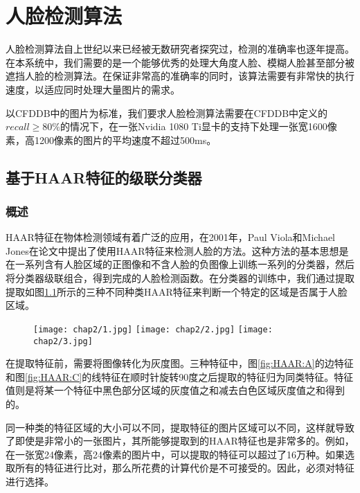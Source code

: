 \chapter{人脸检测算法}
\label{chap:facedetection}

人脸检测算法自上世纪以来已经被无数研究者探究过，检测的准确率也逐年提高。在本系统中，我们需要的是一个能够优秀的处理大角度人脸、模糊人脸甚至部分被遮挡人脸的检测算法。在保证非常高的准确率的同时，该算法需要有非常快的执行速度，以适应同时处理大量图片的需求。

以CFDDB中的图片为标准，我们要求人脸检测算法需要在CFDDB中定义的$recall\geq 80\%$的情况下，在一张Nvidia 1080 Ti显卡的支持下处理一张宽1600像素，高1200像素的图片的平均速度不超过500ms。


\section{基于HAAR特征的级联分类器}

\subsection{概述}
HAAR特征在物体检测领域有着广泛的应用，在2001年，Paul Viola和Michael Jones在论文中提出了使用HAAR特征来检测人脸的方法\cite{viola2004robust}。这种方法的基本思想是在一系列含有人脸区域的正图像和不含人脸的负图像上训练一系列的分类器，然后将分类器级联组合，得到完成的人脸检测函数。在分类器的训练中，我们通过提取提取如图\ref{fig:HAAR}所示的三种不同种类HAAR特征来判断一个特定的区域是否属于人脸区域。

\begin{figure}[!htp]
	\centering
	{\texttt{[image: chap2/1.jpg]}}
	\hspace{4em}
	{\texttt{[image: chap2/2.jpg]}}
	\hspace{4em}
	{\texttt{[image: chap2/3.jpg]}}
	\label{fig:HAAR}
\end{figure}

在提取特征前，需要将图像转化为灰度图。三种特征中，图\ref{fig:HAAR:A}的边特征和图\ref{fig:HAAR:C}的线特征在顺时针旋转90度之后提取的特征归为同类特征。特征值则是将某一个特征中黑色部分区域的灰度值之和减去白色区域灰度值之和得到的。

同一种类的特征区域的大小可以不同，提取特征的图片区域可以不同，这样就导致了即使是非常小的一张图片，其所能够提取到的HAAR特征也是非常多的。例如，在一张宽24像素，高24像素的图片中，可以提取的特征可以超过了16万种。如果选取所有的特征进行比对，那么所花费的计算代价是不可接受的。因此，必须对特征进行选择。

